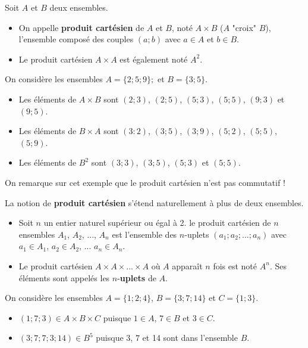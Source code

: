\documentclass[11pt,fleqn, openany]{book} %
\begin{document}
\begin{definition} Soit $A$ et $B$ deux ensembles.
 
 \begin{itemize}
 \item On appelle \textbf{produit cartésien} de $A$ et $B$, noté $A \times B$ ($A$ "croix" $B$), l'ensemble composé des couples $(a;b)$ avec $a \in A$ et $b \in B$. 
 \item Le produit cartésien $A\times A$ est également noté $A^2$.
\end{itemize}\end{definition}

\begin{example}On considère les ensembles $A=\{2;5;9\};$ et $B=\{3;5\}$.
\begin{itemize}
\item  Les éléments de $A \times B$ sont $(2;3)$, $(2;5)$, $(5;3)$, $(5;5)$, $(9;3)$ et $(9;5)$.
\item Les éléments de $B \times A$ sont $(3:2)$, $(3;5)$, $(3;9)$, $(5;2)$, $(5;5)$, $(5;9)$.
\item Les éléments de $B^2$ sont $(3;3)$, $(3;5)$, $(5;3)$ et $(5;5)$.
\end{itemize}\end{example}

On remarque sur cet exemple que le produit cartésien n'est pas commutatif !

\begin{definition} La notion de \textbf{produit cartésien} s'étend naturellement à plus de deux ensembles. 
\begin{itemize}
 \item Soit $n$ un entier naturel supérieur ou égal à 2. le produit cartésien de $n$ ensembles $A_1$, $A_2$, ..., $A_n$ est l'ensemble des $n$-uplets $(a_1;a_2;\ldots;a_n)$ avec $a_1 \in A_1$, $a_2 \in A_2$, ... $ a_n \in A_n$.
 \item Le produit cartésien $A \times A \times ... \times A$ où $A$ apparaît $n$ fois est noté $A^n$. Ses éléments sont appelés les $n$-\textbf{uplets} de $A$.\end{itemize}
\end{definition}

\begin{example} On considère les ensembles $A=\{1;2;4\}$, $B=\{3;7;14\}$ et $C=\{1;3\}$.
\begin{itemize}
\item $(1;7;3) \in A \times B \times C$ puisque $1 \in A$, $7 \in B$ et $3 \in C$.
\item $(3;7;7;3;14) \in B^5$ puisque $3$, $7$ et 14 sont dans l'ensemble $B$.
\end{itemize}\end{example}
\end{document}
